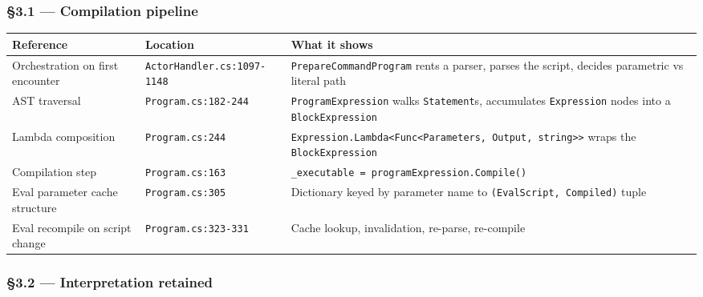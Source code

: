 \documentclass[
]{article}
\newcounter{none} %
\let\origtexttt\texttt%
\renewcommand{\texttt}[1]{\origtexttt{\seqsplit{#1}}}%
\let\texttt\origtexttt%
\begin{document}
\subsubsection{§3.1 --- Compilation
pipeline}\label{compilation-pipeline-1}

{\def\LTcaptype{none} %
\begin{longtable}[]{@{}
  >{\raggedright\arraybackslash}p{}
  >{\raggedright\arraybackslash}p{}
  >{\raggedright\arraybackslash}p{}@{}}
\toprule\noalign{}
\begin{minipage}[b]{\linewidth}\raggedright
Reference
\end{minipage} & \begin{minipage}[b]{\linewidth}\raggedright
Location
\end{minipage} & \begin{minipage}[b]{\linewidth}\raggedright
What it shows
\end{minipage} \\
\midrule\noalign{}
\endhead
\bottomrule\noalign{}
\endlastfoot
Orchestration on first encounter & \texttt{ActorHandler.cs:1097-1148} &
\texttt{PrepareCommandProgram} rents a parser, parses the script,
decides parametric vs literal path \\
AST traversal & \texttt{Program.cs:182-244} & \texttt{ProgramExpression}
walks \texttt{Statement}s, accumulates \texttt{Expression} nodes into a
\texttt{BlockExpression} \\
Lambda composition & \texttt{Program.cs:244} &
\texttt{Expression.Lambda\textless{}Func\textless{}Parameters,\ Output,\ string\textgreater{}\textgreater{}}
wraps the \texttt{BlockExpression} \\
Compilation step & \texttt{Program.cs:163} &
\texttt{\_executable\ =\ programExpression.Compile()} \\
Eval parameter cache structure & \texttt{Program.cs:305} & Dictionary
keyed by parameter name to \texttt{(EvalScript,\ Compiled)} tuple \\
Eval recompile on script change & \texttt{Program.cs:323-331} & Cache
lookup, invalidation, re-parse, re-compile \\
\end{longtable}
}

\subsubsection{§3.2 --- Interpretation
retained}\label{interpretation-retained-1}
\end{document}
